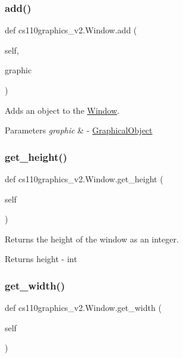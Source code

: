 \subsubsection{\texorpdfstring{add()}{add()}}
{\footnotesize\ttfamily def cs110graphics\+\_\+v2.\+Window.\+add (\begin{DoxyParamCaption}\item[{}]{self,  }\item[{}]{graphic }\end{DoxyParamCaption})}



Adds an object to the \mbox{\hyperlink{classcs110graphics__v2_1_1Window}{Window}}. 


\begin{DoxyParams}{Parameters}
{\em graphic} & -\/ \mbox{\hyperlink{classcs110graphics__v2_1_1GraphicalObject}{Graphical\+Object}} \\
\hline
\end{DoxyParams}
\mbox{\label{classcs110graphics__v2_1_1Window_ac29879272cf20339e3d8d94e7c763b76}} 
\subsubsection{\texorpdfstring{get\_height()}{get\_height()}}
{\footnotesize\ttfamily def cs110graphics\+\_\+v2.\+Window.\+get\+\_\+height (\begin{DoxyParamCaption}\item[{}]{self }\end{DoxyParamCaption})}



Returns the height of the window as an integer. 

\begin{DoxyReturn}{Returns}
height -\/ int 
\end{DoxyReturn}
\mbox{\label{classcs110graphics__v2_1_1Window_a94c8bd08e4b0d3aab302e34bef5751b7}} 
\subsubsection{\texorpdfstring{get\_width()}{get\_width()}}
{\footnotesize\ttfamily def cs110graphics\+\_\+v2.\+Window.\+get\+\_\+width (\begin{DoxyParamCaption}\item[{}]{self }\end{DoxyParamCaption})}



